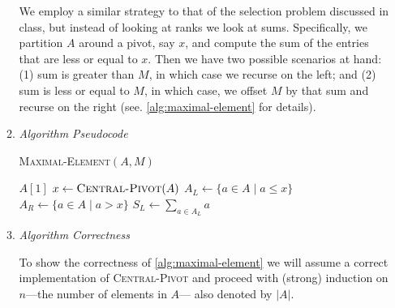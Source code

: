 \documentclass[10pt, letterpaper]{article}
\begin{document}
\begin{enumerate}[label={\bfseries Q\arabic*.}]
\begin{enumerate}
        We employ a similar strategy to that of the selection problem discussed in class, but instead of looking
        at ranks we look at sums. Specifically, we partition $A$ around a pivot, say $x$, and compute the sum of
        the entries that are less or equal to $x$. Then we have two possible scenarios at hand: (1) sum is greater than $M$, in
        which case we recurse on the left; and (2) sum is less or equal to $M$, in which case, we offset $M$ by
        that sum and recurse on the right (see. \autoref{alg:maximal-element} for details).

      \item
        {\itshape Algorithm Pseudocode}
        \vspace{-5mm}
        \begin{center}
          \begin{minipage}{\linewidth}
            \begin{algorithm}[H]
              \caption{\textsc{Maximal-Element}$(A, M)$}\label{alg:maximal-element}
              \begin{algorithmic}[1]
                  \State \Return $A[1]$
                \EndIf
                \State
                \State $x \gets \Call{Central-Pivot}{A}$
                \State $A_L \gets \{a \in A \mid a \leq x\}$
                \State $A_R \gets \{a \in A \mid a > x\}$
                \State $S_L \gets \sum_{a \in A_L} a$
                \State
                  \State \Return {}
                \Else
                  \State \Return {}
                \EndIf
              \end{algorithmic}
            \end{algorithm}
          \end{minipage}
        \end{center}

      \item
        {\itshape Algorithm Correctness} \\ \vspace{-4mm}

        To show the correctness of \autoref{alg:maximal-element} we will assume a correct implementation of
        \textsc{Central-Pivot} and proceed with (strong) induction on $n$---the number of elements in $A$---
        also denoted by $|A|$. \\


\end{enumerate}
\end{enumerate}
\end{document}
